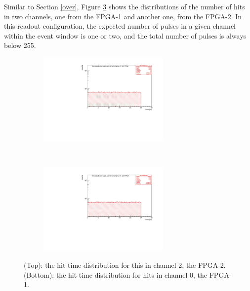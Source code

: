 Similar to Section \ref{over}, Figure \ref{fig:4} shows the distributions
of the number of hits in two channels, one from the 
FPGA-1 and another one, from the FPGA-2. 
In this readout configuration, the expected number of pulses in a given channel
within the event window is one or two, and the total number of pulses is always below 255.

\begin{figure}[!h]
  \begin{subfigure}[b]{\textwidth}
      \centering
      \includegraphics[width=0.7\textwidth]{figures/pdf/figure_00001_timedistr_roc_simulation_10538.pdf}
      \label{fig:ttt1}
  \end{subfigure}
\\
  \begin{subfigure}[b]{\textwidth}
      \centering
      \includegraphics[width=0.7\textwidth]{figures/pdf/figure_00012_timedistr_roc_simulation_ch2_105038.pdf}
      \label{fig:ttt2}
  \end{subfigure}
     \caption{(Top): the hit time distribution for this in channel 2, the FPGA-2. 
     (Bottom): the hit time distribution for hits in channel 0, the FPGA-1.}
     \label{fig:4}
\end{figure}

